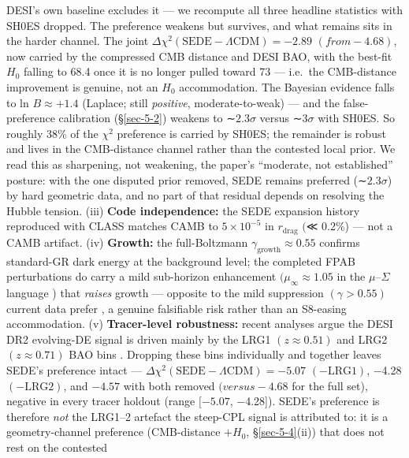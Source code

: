 \documentclass[preprint,12pt]{elsarticle}
\begin{document}
DESI's own baseline excludes it --- we recompute all three headline
statistics with SH0ES dropped. The preference weakens but survives, and
what remains sits in the harder channel. The joint
\(\Delta \chi ^{2}(\mathrm{SEDE} - \Lambda \mathrm{CDM}) = -2.89\)
\((from -4.68)\), now carried by the compressed CMB distance and DESI
BAO, with the best-fit \(H_{0}\) falling to 68.4 once it is no longer
pulled toward 73 --- i.e.~the CMB-distance improvement is genuine, not
an \(H_{0}\) accommodation. The Bayesian evidence falls to ln
\(B \approx  +1.4\) (Laplace; still \emph{positive}, moderate-to-weak)
--- and the false-preference calibration (§\ref{sec-5-2}) weakens to
∼\(2.3\sigma\) versus ∼\(3\sigma\) with SH0ES. So roughly 38\% of the
\(\chi ^{2}\) preference is carried by SH0ES; the remainder is robust
and lives in the CMB-distance channel rather than the contested local
prior. We read this as sharpening, not weakening, the paper's
``moderate, not established'' posture: with the one disputed prior
removed, SEDE remains preferred (∼\(2.3\sigma\)) by hard geometric data,
and no part of that residual depends on resolving the Hubble tension.
(iii) \textbf{Code independence:} the SEDE expansion history reproduced
with CLASS matches CAMB to \(5\times 10^{-5}\) in \(r_{\mathrm{drag}}\)
\((\)≪ 0.2\%) --- not a CAMB artifact. (iv) \textbf{Growth:} the
full-Boltzmann \(\gamma _{\mathrm{growth}} \approx  0.55\)
\citep{Linder:2007hg} confirms standard-GR dark energy at the background
level; the completed FPAB perturbations do carry a mild sub-horizon
enhancement \((\mu _\infty  \approx  1.05\) in the \(\mu\)--\(\Sigma\)
language \citep{Pogosian:2016pwr, Silvestri:2013ne}) that \emph{raises}
growth --- opposite to the mild suppression \((\gamma  > 0.55)\) current
data prefer \citep{Nguyen:2023fip}, a genuine falsifiable risk rather
than an S8-easing accommodation. (v) \textbf{Tracer-level robustness:}
recent analyses argue the DESI DR2 evolving-DE signal is driven mainly
by the LRG1 \((z\approx 0.51)\) and LRG2 \((z\approx 0.71)\) BAO bins
\citep{Chaudhary:2025vzy, Wang:2025bkk}. Dropping these bins
individually and together leaves SEDE's preference intact ---
\(\Delta \chi ^{2}(\mathrm{SEDE} - \Lambda \mathrm{CDM}) = -5.07\)
\((-\mathrm{LRG}1)\), −4.28 \((-\mathrm{LRG}2)\), and \(-4.57\) with
both removed \((versus -4.68\) for the full set), negative in every
tracer holdout (range \([-5.07\), −4.28{]}). SEDE's preference is
therefore \emph{not} the LRG1--2 artefact the steep-CPL signal is
attributed to: it is a geometry-channel preference (CMB-distance
\(+ H_{0}\), §\ref{sec-5-4}(ii)) that does not rest on the contested
\end{document}
